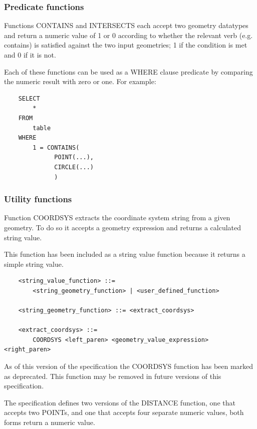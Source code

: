 \documentclass[11pt,a4paper]{ivoa}
\begin{document}
\subsubsection{Predicate functions}
\label{sec:functions.geom.predicate}

Functions CONTAINS and INTERSECTS each accept two geometry datatypes
and return a numeric value of 1 or 0 according to whether the relevant
verb (e.g. contains) is satisfied against the two input geometries;
1 if the condition is met and 0 if it is not.

Each of these functions can be used as a WHERE clause predicate by
comparing the numeric result with zero or one.
For example:
\begin{verbatim}
    SELECT
        *
    FROM
        table
    WHERE
        1 = CONTAINS(
              POINT(...),
              CIRCLE(...)
              )
\end{verbatim}


\subsubsection{Utility functions}
\label{sec:functions.geom.utility}

Function COORDSYS extracts the coordinate system string from a given
geometry. To do so it accepts a geometry expression and returns a calculated
string value.

This function has been included as a string value function because it
returns a simple string value.

\begin{verbatim}
    <string_value_function> ::=
        <string_geometry_function> | <user_defined_function>

    <string_geometry_function> ::= <extract_coordsys>

    <extract_coordsys> ::=
        COORDSYS <left_paren> <geometry_value_expression> <right_paren>
\end{verbatim}

As of this version of the specification the COORDSYS function has
been marked as deprecated. This function may be removed in future versions
of this specification.

The specification defines two versions of the DISTANCE function,
one that accepts two POINTs, and one that accepts four
separate numeric values, both forms return a numeric value.
\end{document}
